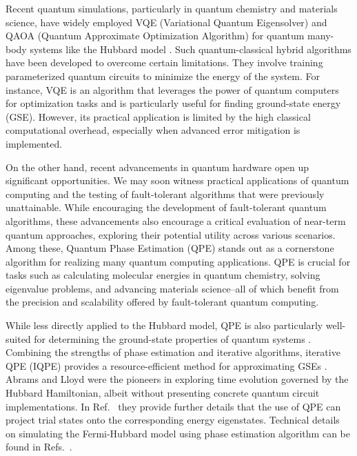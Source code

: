 \documentclass[twocolumn,superscriptaddress,amsmath,amssymb,showpacs,floatfix,preprintnumbers]{revtex4-1}
\begin{document}
Recent quantum simulations, particularly in quantum chemistry and materials science, 
have widely employed VQE (Variational Quantum Eigensolver) \cite{Cerezo2021,Alexeev2024} and 
QAOA (Quantum Approximate Optimization Algorithm) \cite{Farhi2014} 
for quantum many-body systems like the Hubbard model
\cite{Stanisic2022,Martin2022,Tilly2022,Blekos2024}. 
Such quantum-classical hybrid algorithms have been developed to overcome certain limitations.
% 
They involve training parameterized quantum circuits to minimize the energy of the system.
%
For instance, VQE is an algorithm that leverages the power of quantum
computers for optimization tasks and is particularly useful for finding ground-state energy (GSE). 
%
However, its practical application is limited by the high classical computational overhead, 
especially when advanced error mitigation is implemented.

On the other hand, recent advancements in quantum hardware open up significant opportunities.
%
We may soon witness practical applications of quantum computing and the testing of fault-tolerant 
algorithms that were previously unattainable.
%
While encouraging the development of fault-tolerant quantum algorithms, these advancements 
also encourage a critical evaluation of near-term quantum approaches, exploring their 
potential utility across various scenarios.
%
Among these, Quantum Phase Estimation (QPE) \cite{Nielsen2010} stands out as a cornerstone
algorithm for realizing many quantum computing applications. 
%
QPE is crucial for tasks such as calculating molecular energies in quantum chemistry, solving
eigenvalue problems, and advancing materials science--all of which benefit from the precision 
and scalability offered by fault-tolerant quantum computing.

While less directly applied to the Hubbard model, QPE is also particularly well-suited for
determining the ground-state properties of quantum systems
\cite{Wecker2015s,Kitaev1995,Abrams1997,Abrams1999,Guzik2005,Whitfield2011}.
%
Combining the strengths of phase estimation and iterative algorithms, iterative QPE (IQPE) provides
a resource-efficient method for approximating GSEs 
\cite{Whitfield2011,Parker2000,Dobsicek2007,Mei2007}.
%
Abrams and Lloyd \cite{Abrams1997} were the pioneers in exploring time evolution governed by
the Hubbard Hamiltonian, albeit without presenting concrete quantum circuit implementations.
%
In Ref.~\cite{Abrams1999} they provide further details that the use of QPE can project trial 
states onto the corresponding energy eigenstates.
%
Technical details on simulating the Fermi-Hubbard model using phase estimation algorithm can 
be found in Refs.\ \cite{Wecker2015s,Whitfield2011}.
\end{document}
